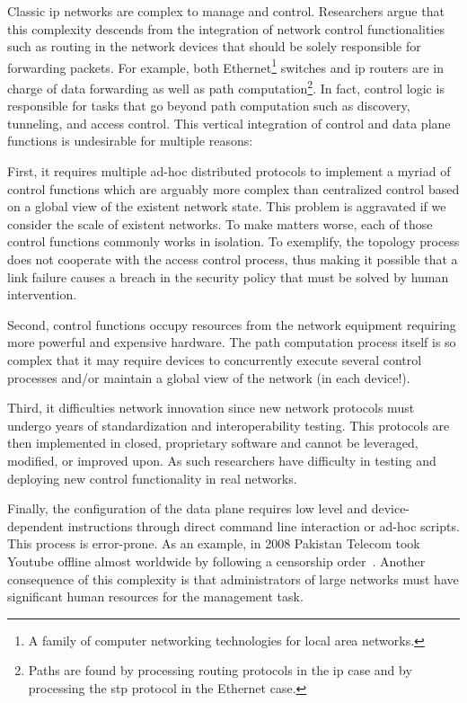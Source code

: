 

Classic \gls{ip} networks are complex to manage and control. 
Researchers argue that this complexity descends from the integration of network control functionalities such as routing 
in the network devices that should be solely responsible for forwarding packets. 
For example, both Ethernet\footnote{A family of computer networking technologies for local area networks.}  switches and \gls{ip} routers are in charge of  data forwarding as well as path computation\footnote{Paths are found by processing routing protocols in the \gls{ip} case and by processing the \gls{stp} protocol in the Ethernet case.}. 
In fact, control logic is responsible for  tasks that go beyond path computation such as  discovery, tunneling, and  access control. 
This vertical integration of control and data plane functions is  undesirable for multiple reasons:

First, it requires multiple ad-hoc distributed protocols to implement a myriad of control functions which are arguably more complex than centralized control based on a global view of the existent network state.  
This problem is aggravated if we consider the scale of existent networks. 
To make matters worse, each of those control functions commonly works in isolation. 
To exemplify, the topology process does not cooperate with the access control process, thus making it possible that a link failure causes a breach in the security policy that must be solved by human intervention. 

Second, control functions occupy resources from the network equipment requiring more powerful and expensive hardware. 
The path computation process itself is so complex that it may require devices to concurrently execute several control processes and/or maintain a global view of the network (in each device!).  

Third, it difficulties network innovation since new network protocols must undergo years of standardization and interoperability testing. 
This protocols are then implemented in closed, proprietary software and cannot be leveraged, modified, or improved upon. 
As such researchers have difficulty in testing and deploying new control functionality in real networks. 


Finally, the configuration of the data plane requires low level and device-dependent instructions through direct command line interaction or ad-hoc scripts. 
This process is error-prone. 
As an example, in 2008 Pakistan Telecom took Youtube offline almost worldwide by following a censorship order~\cite{McCullagh:2008fk}.
Another consequence of this complexity is that administrators of large networks  must have significant human resources for the management task.  

